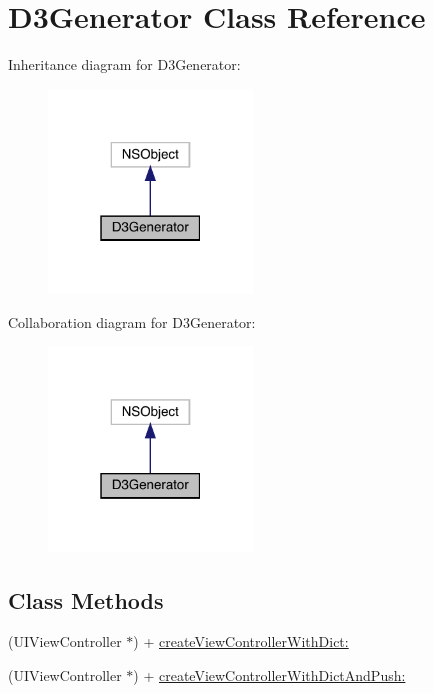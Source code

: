 \hypertarget{interface_d3_generator}{}\section{D3\+Generator Class Reference}
\label{interface_d3_generator}


Inheritance diagram for D3\+Generator\+:\nopagebreak
\begin{figure}[H]
\begin{center}
\leavevmode
\includegraphics[width=154pt]{interface_d3_generator__inherit__graph}
\end{center}
\end{figure}


Collaboration diagram for D3\+Generator\+:\nopagebreak
\begin{figure}[H]
\begin{center}
\leavevmode
\includegraphics[width=154pt]{interface_d3_generator__coll__graph}
\end{center}
\end{figure}
\subsection*{Class Methods}
\begin{DoxyCompactItemize}
\item 
(U\+I\+View\+Controller $\ast$) + \mbox{\hyperlink{interface_d3_generator_ae6507d6ef5433366f40be9762ffb5b01}{create\+View\+Controller\+With\+Dict\+:}}
\item 
(U\+I\+View\+Controller $\ast$) + \mbox{\hyperlink{interface_d3_generator_a341215ec01f51ca7759029dec6b41dce}{create\+View\+Controller\+With\+Dict\+And\+Push\+:}}
\end{DoxyCompactItemize}


